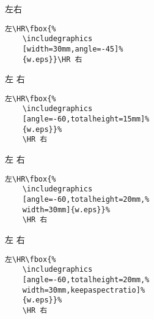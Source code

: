 \hspace{-1cm}\begin{minipage}[c]{.45\textwidth}
	左\HR{}\HR 右
\end{minipage}%
\begin{minipage}[c]{.5\textwidth}
	\begin{Verbatim}[frame=lines,label=\colorbox{green}{\small 例七},labelposition=topline]
	左\HR\fbox{%
	\includegraphics
	[width=30mm,angle=-45]%
	{w.eps}}\HR 右
	\end{Verbatim}
\end{minipage}

\begin{minipage}[c]{.45\textwidth}
	左\HR\fbox{%
		\texttt{[image: w]}}%
	\HR 右
\end{minipage}%
\hspace{-.5cm}\begin{minipage}[c]{.5\textwidth}
	\begin{Verbatim}[frame=lines,label=\colorbox{green}{\small 例八},labelposition=topline]
	左\HR\fbox{%
	\includegraphics
	[angle=-60,totalheight=15mm]%
	{w.eps}}%
	\HR 右
	\end{Verbatim}
\end{minipage}

\begin{minipage}[c]{.45\textwidth}
	左\HR\fbox{%
		\texttt{[image: w]}}%
	\HR 右
\end{minipage}%
\hspace{-.5cm}\begin{minipage}[c]{.5\textwidth}
	\begin{Verbatim}[frame=lines,label=\colorbox{green}{\small 例九},labelposition=topline]
	左\HR\fbox{%
	\includegraphics
	[angle=-60,totalheight=20mm,%
	width=30mm]{w.eps}}%
	\HR 右
	\end{Verbatim}
\end{minipage}

\begin{minipage}[c]{.45\textwidth}
	左\HR\fbox{%
		\texttt{[image: w]}}%
	\HR 右
\end{minipage}%
\hspace{-.5cm}\begin{minipage}[c]{.5\textwidth}
	\begin{Verbatim}[frame=lines,label=\colorbox{green}{\small 例十},labelposition=topline]
	左\HR\fbox{%
	\includegraphics
	[angle=-60,totalheight=20mm,%
	width=30mm,keepaspectratio]%
	{w.eps}}%
	\HR 右
	\end{Verbatim}
\end{minipage}

